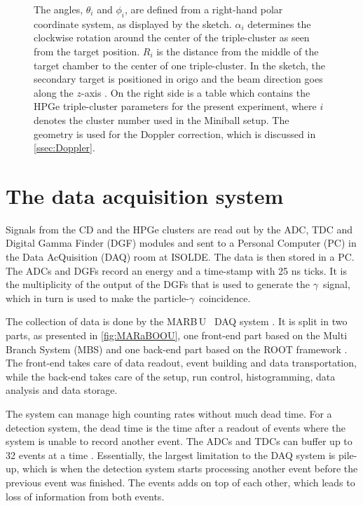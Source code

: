 \documentclass[twoside,english]{uiofysmaster/uiofysmaster}
\newcommand{\ga}{$\gamma$}
\newcommand{\MBOU}{MAR\belowbaseline[-2pt]{a}B\stackinset{l}{3pt}{b}{-3pt}{O}{O}\,U}
\let\orgautoref\autoref
\renewcommand{\autoref}
        {%
		 \def\sectionautorefname{Section}%
		 \def\subsectionautorefname{Section}%
		 \def\subsubsectionautorefname{Section}%
		 \def\chapterautorefname{Chapter}%
          \orgautoref}
\begin{document}
\begin{figure}[htb]
{	The angles, $\theta_i$ and $\phi_i$, are defined from a right-hand polar coordinate system, as displayed by the sketch.
	$\alpha_i$ determines the clockwise rotation around the center of the triple-cluster as seen from the target position.
	$R_i$ is the distance from the middle of the target chamber to the center of one triple-cluster.
	In the sketch, the secondary target is positioned in origo and the beam direction goes along the $z$-axis \cite{NWarr-Angles, Rosiak}. 
	On the right side is a table which contains the HPGe triple-cluster parameters for the present experiment, where $i$ denotes the cluster number used in the Miniball setup. 
	The geometry is used for the Doppler correction, which is discussed in \autoref{ssec:Doppler}.}
	\label{fig:HPGe}
\end{figure}


\section{The data acquisition system}\label{sec:DAQ}
Signals from the CD and the HPGe clusters are read out by the ADC, TDC and Digital Gamma Finder (DGF) modules and sent to a Personal Computer (PC) in the Data AcQuisition (DAQ) room at ISOLDE. 
The data is then stored in a PC. 
The ADCs and DGFs record an energy and a time-stamp with 25 ns ticks. 
It is the multiplicity of the output of the DGFs that is used to generate the \ga\ signal, which in turn is used to make the particle-\ga\ coincidence.

The collection of data is done by the \MBOU\ \cite{Maraboou, Maraboou-web} DAQ system \cite{MB-spect}. 
It is split in two parts, as presented in \autoref{fig:MARaBOOU}, one front-end part based on the Multi Branch System (MBS) \cite{MBS} and one back-end part based on the ROOT framework \cite{ROOT}.
The front-end takes care of data readout, event building and data transportation, while the back-end takes care of the setup, run control, histogramming, data analysis and data storage. 

The system can manage high counting rates without much dead time. 
For a detection system, the dead time is the time after a readout of events where the system is unable to record another event. 
The ADCs and TDCs can buffer up to 32 events at a time \cite{MB-spect}. 
Essentially, the largest limitation to the DAQ system is pile-up, which is when the detection system starts processing another event before the previous event was finished. 
The events adds on top of each other, which leads to loss of information from both events.
\end{document}
